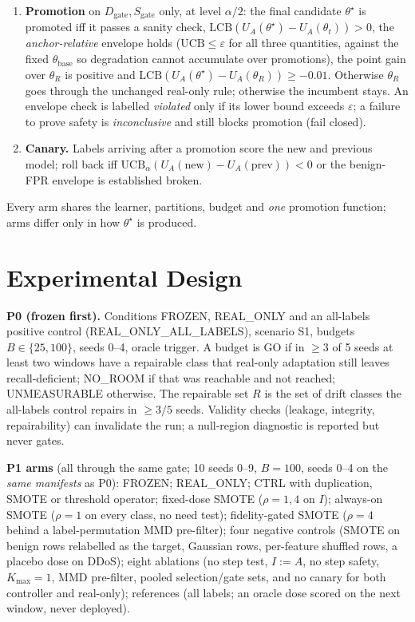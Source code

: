 \documentclass[conference]{IEEEtran}
\newcommand{\thR}{\theta_{R}}
\newcommand{\thb}{\theta_{\mathrm{base}}}
\newcommand{\eps}{\varepsilon}
\begin{document}
\begin{enumerate}
\item \textbf{Promotion} on $D_{\mathrm{gate}},S_{\mathrm{gate}}$ only, at level $\alpha/2$: the final candidate $\theta^\star$ is promoted iff it passes a sanity check, $\mathrm{LCB}(U_A(\theta^\star)-U_A(\theta_t))>0$, the \emph{anchor-relative} envelope holds ($\mathrm{UCB}\le\eps$ for all three quantities, against the fixed $\thb$ so degradation cannot accumulate over promotions), the point gain over $\thR$ is positive and $\mathrm{LCB}(U_A(\theta^\star)-U_A(\thR))\ge-0.01$. Otherwise $\thR$ goes through the unchanged real-only rule; otherwise the incumbent stays. An envelope check is labelled \emph{violated} only if its lower bound exceeds $\eps$; a failure to prove safety is \emph{inconclusive} and still blocks promotion (fail closed).
\item \textbf{Canary.} Labels arriving after a promotion score the new and previous model; roll back iff $\mathrm{UCB}_\alpha(U_A(\mathrm{new})-U_A(\mathrm{prev}))<0$ or the benign-FPR envelope is established broken.
\end{enumerate}
Every arm shares the learner, partitions, budget and \emph{one} promotion function; arms differ only in how $\theta^\star$ is produced.

\section{Experimental Design}\label{sec:design}
\textbf{P0 (frozen first).} Conditions FROZEN, REAL\_ONLY and an all-labels positive control (REAL\_ONLY\_ALL\_LABELS), scenario S1, budgets $B\in\{25,100\}$, seeds 0--4, oracle trigger. A budget is GO if in $\ge3$ of 5 seeds at least two windows have a repairable class that real-only adaptation still leaves recall-deficient; NO\_ROOM if that was reachable and not reached; UNMEASURABLE otherwise. The repairable set $R$ is the set of drift classes the all-labels control repairs in $\ge3/5$ seeds. Validity checks (leakage, integrity, repairability) can invalidate the run; a null-region diagnostic is reported but never gates.

\textbf{P1 arms} (all through the same gate; 10 seeds 0--9, $B{=}100$, seeds 0--4 on the \emph{same manifests} as P0): FROZEN; REAL\_ONLY; CTRL with duplication, SMOTE or threshold operator; fixed-dose SMOTE ($\rho{=}1,4$ on $I$); always-on SMOTE ($\rho{=}1$ on every class, no need test); fidelity-gated SMOTE ($\rho{=}4$ behind a label-permutation MMD pre-filter); four negative controls (SMOTE on benign rows relabelled as the target, Gaussian rows, per-feature shuffled rows, a placebo dose on DDoS); eight ablations (no step test, $I{:=}A$, no step safety, $K_{\max}{=}1$, MMD pre-filter, pooled selection/gate sets, and no canary for both controller and real-only); references (all labels; an oracle dose scored on the next window, never deployed).
\end{document}
